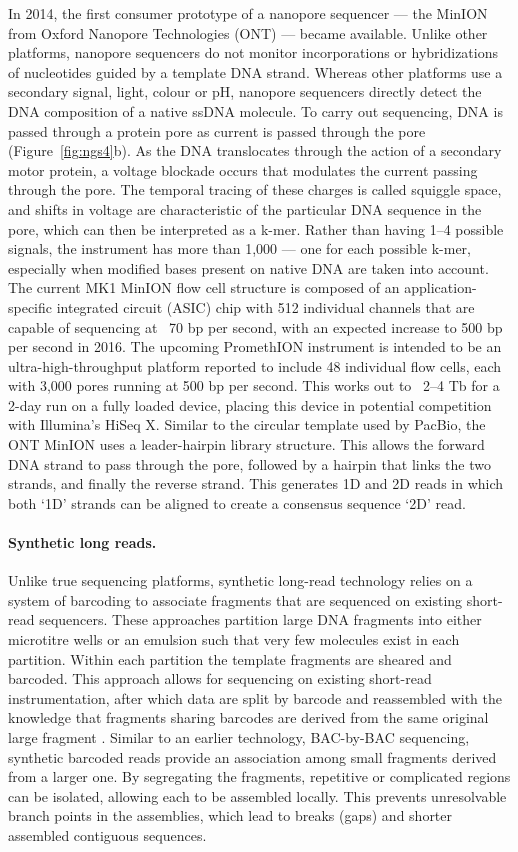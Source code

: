 In 2014, the first consumer prototype of a nanopore sequencer — the MinION from Oxford Nanopore Technologies (ONT) — became available. Unlike other 
platforms, nanopore sequencers do not monitor incorporations or hybridizations of nucleotides guided by a template DNA strand. Whereas other platforms use a 
secondary signal, light, colour or pH, nanopore sequencers directly detect the DNA composition of a native ssDNA molecule. To carry out sequencing, DNA is 
passed through a protein pore as current is passed through the pore \citep{clarke2009continuous}(Figure~\ref{fig:ngs4}b). As the DNA translocates through the action of a secondary motor protein, a voltage blockade occurs that modulates the current passing 
through the pore. The temporal tracing of these charges is called squiggle space, and shifts in voltage are characteristic of the particular DNA sequence in the pore, which can then be interpreted as a 
k-mer. Rather than having 1–4 possible signals, the instrument has more than 1,000 — one for each possible k-mer, especially when modified bases present on native DNA are taken into account. The current MK1 MinION flow cell structure is composed of an application-specific integrated 
circuit (ASIC) chip with 512 individual channels that are capable of sequencing at ~70 bp per second, with an expected increase to 500 bp per second in 2016. The upcoming PromethION instrument is intended to be an ultra-high-throughput platform reported to include 
48 individual flow cells, each with 3,000 pores running at 500 bp per second. This works out to ~2–4 Tb for a 2-day run on a fully loaded device, placing this device in potential competition with Illumina’s HiSeq X. Similar to 
the circular template used by PacBio, the ONT MinION uses a leader-hairpin library structure. This allows the forward DNA strand to pass through the pore, followed by a hairpin that links the two strands, and finally the 
reverse strand. This generates 1D and 2D reads in which both ‘1D’ strands can be aligned to create a consensus sequence ‘2D’ read.

\paragraph{Synthetic long reads.}
Unlike true sequencing platforms, synthetic long-read technology relies on a system of barcoding to associate fragments that are sequenced on existing short-read sequencers. These approaches partition large DNA fragments into either microtitre wells 
or an emulsion such that very few molecules exist in each partition. Within each partition the template fragments are sheared and barcoded. This approach allows for sequencing on existing short-read instrumentation, 
after which data are split by barcode and reassembled with the knowledge that fragments sharing barcodes are derived from the same original large fragment \citep{mccoy2014illumina}. Similar to an earlier technology, 
BAC-by-BAC sequencing, synthetic barcoded reads provide an association among small fragments derived from a larger one. By segregating the fragments, repetitive or complicated regions can be isolated, allowing each to be assembled locally. 
This prevents unresolvable branch points in the assemblies, which lead to breaks (gaps) and shorter assembled contiguous  sequences.


